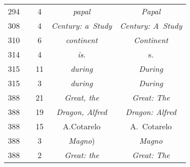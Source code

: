 \documentclass[a4paper,11pt]{article}
\begin{document}
\begin{center}
\begin{tabular}{|c|c|c|c|c|}
    294 & &  4 & \textit{papal} & \textit{Papal} \\
    308 & &  4 & \textit{Century: a~Study} & \textit{Century: A~Study} \\
    310 & &  6 & \textit{continent} & \textit{Continent} \\
    314 & &  4 & \textit{is.} & s. \\
    315 & & 11 & \textit{during} & \textit{During} \\
    315 & &  3 & \textit{during} & \textit{During} \\
    388 & & 21 & \textit{Great, the} & \textit{Great: The} \\
    388 & & 19 & \textit{Dragon, Alfred} & \textit{Dragon: Alfred} \\
    388 & & 15 & A.Cotarelo & A.~Cotarelo \\
    388 & &  3 & \textit{Magno}) & \textit{Magno} \\
    388 & &  2 & \textit{Great: the} & \textit{Great: The} \\
    \hline
  \end{tabular}






\end{center}
\end{document}

